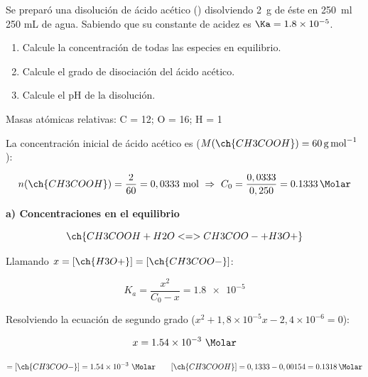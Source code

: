 \begin{exerciseEVAU}
    Se preparó una disolución de ácido acético () disolviendo \SI{2}{\g} de éste en \SI{250}{\milli\litre}  250 mL de agua.
    Sabiendo que su constante de acidez es \( \Ka = \num{1.8e-5} \).
    \begin{enumerate}[label=\letraminuscula]
        \item Calcule la concentración de todas las especies en equilibrio.
        \item Calcule el grado de disociación del ácido acético.
        \item Calcule el pH de la disolución.
    \end{enumerate}

    \datos{} Masas atómicas relativas: C = 12; O = 16; H = 1
    \begin{solu}

        La concentración inicial de ácido acético es (\(M(\ch{CH3COOH}) = \SI{60}{\gram\per\mole}\)):

        \begin{equation*}
            n(\ch{CH3COOH}) = \dfrac{2}{60} = 0,0333 \ \text{mol} \ \Rightarrow \ C_0 = \dfrac{0,0333}{0,250} = \SI{0.1333}{\Molar}
        \end{equation*}

        \textbf{a) Concentraciones en el equilibrio}

        \begin{equation*}
            \ch{CH3COOH + H2O <=> CH3COO- + H3O+}
        \end{equation*}

        Llamando \(x = [\ch{H3O+}] = [\ch{CH3COO-}]\):

        \begin{equation*}
            K_a = \dfrac{x^2}{C_0-x} = \num{1.8e-5}
        \end{equation*}

        Resolviendo la ecuación de segundo grado (\(x^2 + 1,8\times10^{-5}x - 2,4\times10^{-6}=0\)):

        \begin{equation*}
            x = \num{1.54e-3} \ \si{\Molar}
        \end{equation*}

        \begin{equation*}
            [\ch{H3O+}] = [\ch{CH3COO-}] = \num{1.54e-3} \ \si{\Molar} \qquad [\ch{CH3COOH}] = 0,1333-0,00154 = \SI{0.1318}{\Molar}
        \end{equation*}


\end{solu}
\end{exerciseEVAU}
